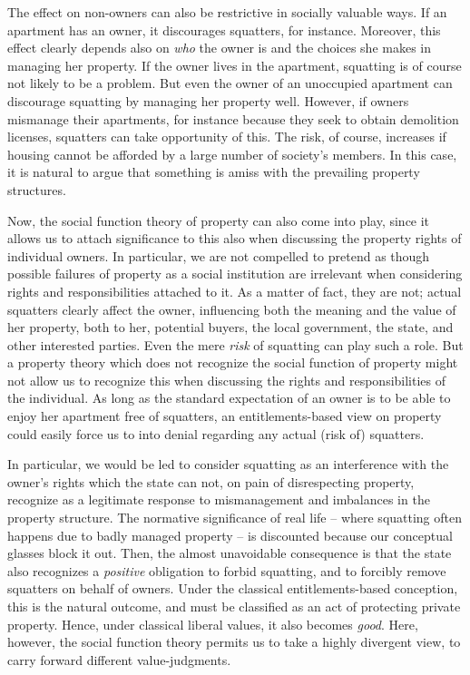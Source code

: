 The effect on non-owners can also be restrictive in socially valuable ways. If an apartment has an owner, it discourages squatters, for instance. Moreover, this effect clearly depends also on {\it who} the owner is and the choices she makes in managing her property. If the owner lives in the apartment, squatting is of course not likely to be a problem. But even the owner of an unoccupied apartment can discourage squatting by managing her property well. However, if owners mismanage their apartments, for instance because they seek to obtain demolition licenses, squatters can take opportunity of this. The risk, of course, increases if housing cannot be afforded by a large number of society's members. In this case, it is natural to argue that something is amiss with the prevailing property structures.

Now, the social function theory of property can also come into play, since it allows us to attach significance to this also when discussing the property rights of individual owners.  In particular, we are not compelled to pretend as though possible failures of property as a social institution are irrelevant when considering rights and responsibilities attached to it. As a matter of fact, they are not; actual squatters clearly affect the owner, influencing both the meaning and the value of her property, both to her, potential buyers, the local government, the state, and other interested parties. Even the mere {\it risk} of squatting can play such a role. But a property theory which does not recognize the social function of property might not allow us to recognize this when discussing the rights and responsibilities of the individual. As long as the standard expectation of an owner is to be able to enjoy her apartment free of squatters, an entitlements-based view on property could easily force us to into denial regarding any actual (risk of) squatters.

In particular, we would be led to consider squatting as an interference with the owner's rights which the state can not, on pain of disrespecting property, recognize as a legitimate response to mismanagement and imbalances in the property structure. The normative significance of real life -- where squatting often happens due to badly managed property -- is discounted  because our conceptual glasses block it out. Then, the almost unavoidable consequence is that the state also recognizes a {\it positive} obligation to forbid squatting, and to forcibly remove squatters on behalf of owners. Under the classical entitlements-based conception, this is the natural outcome, and must be classified as an act of protecting private property. Hence, under classical liberal values, it also becomes {\it good}. Here, however, the social function theory permits us to take a highly divergent view, to carry forward different value-judgments.

